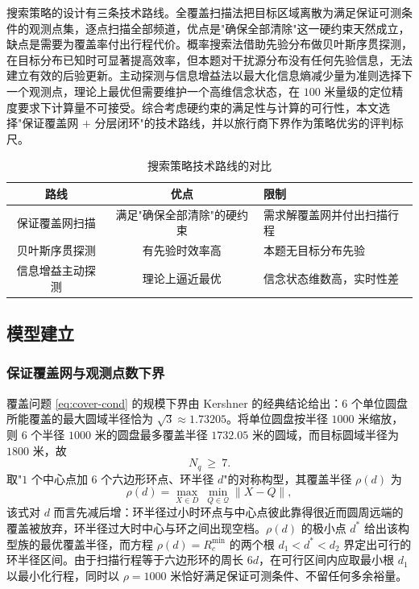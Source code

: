 \documentclass[12pt,a4paper]{ctexart}
\begin{document}
搜索策略的设计有三条技术路线。全覆盖扫描法把目标区域离散为满足保证可测条件的观测点集，逐点扫描全部频道，优点是"确保全部清除"这一硬约束天然成立，缺点是需要为覆盖率付出行程代价。概率搜索法借助先验分布做贝叶斯序贯探测，在目标分布已知时可显著提高效率，但本题对干扰源分布没有任何先验信息，无法建立有效的后验更新。主动探测与信息增益法以最大化信息熵减少量为准则选择下一个观测点，理论上最优但需要维护一个高维信念状态，在 $100$ 米量级的定位精度要求下计算量不可接受。综合考虑硬约束的满足性与计算的可行性，本文选择"保证覆盖网 $+$ 分层闭环"的技术路线，并以旅行商下界作为策略优劣的评判标尺。

\begin{table}[H]
  \centering
  \caption{搜索策略技术路线的对比}
  \label{tab:p3-algo}
  \begin{tabularx}{\textwidth}{CCL}
    \toprule
    路线 & 优点 & 限制 \\
    \midrule
    保证覆盖网扫描 & 满足"确保全部清除"的硬约束 & 需求解覆盖网并付出扫描行程 \\
    贝叶斯序贯探测 & 有先验时效率高 & 本题无目标分布先验 \\
    信息增益主动探测 & 理论上逼近最优 & 信念状态维数高，实时性差 \\
    \bottomrule
  \end{tabularx}
\end{table}

\subsection{模型建立}

\subsubsection{保证覆盖网与观测点数下界}

覆盖问题 \eqref{eq:cover-cond} 的规模下界由 Kershner 的经典结论给出：$6$ 个单位圆盘所能覆盖的最大圆域半径恰为 $\sqrt3\approx1.73205$。将单位圆盘按半径 $1000$ 米缩放，则 $6$ 个半径 $1000$ 米的圆盘最多覆盖半径 $1732.05$ 米的圆域，而目标圆域半径为 $1800$ 米，故
\begin{equation}
N_q\ \ge\ 7 .
\label{eq:lower-bound}
\end{equation}
取"$1$ 个中心点加 $6$ 个六边形环点、环半径 $d$"的对称构型，其覆盖半径 $\rho(d)$ 为
\begin{equation}
\rho(d)=\max_{X\in D}\ \min_{Q\in\mathcal Q}\lVert X-Q\rVert ,
\label{eq:rho-d}
\end{equation}
该式对 $d$ 而言先减后增：环半径过小时环点与中心点彼此靠得很近而圆周远端的覆盖被放弃，环半径过大时中心与环之间出现空档。$\rho(d)$ 的极小点 $d^{*}$ 给出该构型族的最优覆盖半径，而方程 $\rho(d)=R_c^{\min}$ 的两个根 $d_1<d^{*}<d_2$ 界定出可行的环半径区间。由于扫描行程等于六边形环的周长 $6d$，在可行区间内应取最小根 $d_1$ 以最小化行程，同时以 $\rho=1000$ 米恰好满足保证可测条件、不留任何多余裕量。
\end{document}
